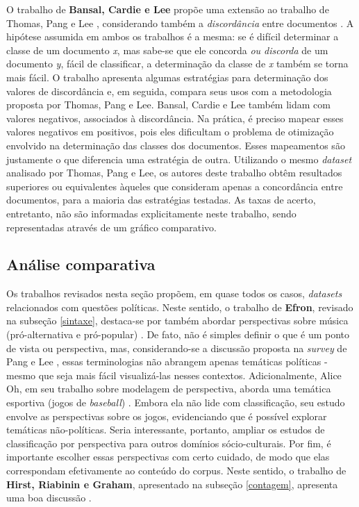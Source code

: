O trabalho de \textbf{Bansal, Cardie e Lee} propõe uma extensão ao trabalho de Thomas, Pang e Lee \cite{get-out-the-vote}, considerando também a \emph{discordância} entre documentos \cite{disagree}. A hipótese assumida em ambos os trabalhos é a mesma: se é difícil determinar a classe de um documento \emph{x}, mas sabe-se que ele concorda \emph{ou discorda} de um documento \emph{y}, fácil de classificar, a determinação da classe de \emph{x} também se torna mais fácil. O trabalho apresenta algumas estratégias para determinação dos valores de discordância e, em seguida, compara seus usos com a metodologia proposta por Thomas, Pang e Lee. Bansal, Cardie e Lee também lidam com valores negativos, associados à discordância. Na prática, é preciso mapear esses valores negativos em positivos, pois eles dificultam o problema de otimização envolvido na determinação das classes dos documentos. Esses mapeamentos são justamente o que diferencia uma estratégia de outra. Utilizando o mesmo \emph{dataset} analisado por Thomas, Pang e Lee, os autores deste trabalho obtêm resultados superiores ou equivalentes àqueles que consideram apenas a concordância entre documentos, para a maioria das estratégias testadas. As taxas de acerto, entretanto, não são informadas explicitamente neste trabalho, sendo representadas através de um gráfico comparativo.



\subsection{Análise comparativa}
\label{compara}

Os trabalhos revisados nesta seção propõem, em quase todos os casos, \emph{datasets} relacionados com questões políticas. Neste sentido, o trabalho de \textbf{Efron}, revisado na subseção \ref{sintaxe}, destaca-se por também abordar perspectivas sobre música (pró-alternativa e pró-popular) \cite{efron}. De fato, não é simples definir o que é um ponto de vista ou perspectiva, mas, considerando-se a discussão proposta na \emph{survey} de Pang e Lee \cite{omsa}, essas terminologias não abrangem apenas temáticas políticas - mesmo que seja mais fácil visualizá-las nesses contextos. Adicionalmente, Alice Oh, em seu trabalho sobre modelagem de perspectiva, aborda uma temática esportiva (jogos de \emph{baseball}) \cite{alice-oh}. Embora ela não lide com classificação, seu estudo envolve as perspectivas sobre os jogos, evidenciando que é possível explorar temáticas não-políticas. Seria interessante, portanto, ampliar os estudos de classificação por perspectiva para outros domínios sócio-culturais. Por fim, é importante escolher essas perspectivas com certo cuidado, de modo que elas correspondam efetivamente ao conteúdo do corpus. Neste sentido, o trabalho de \textbf{Hirst, Riabinin e Graham}, apresentado na subseção \ref{contagem}, apresenta uma boa discussão \cite{hirst-et-al}. 

